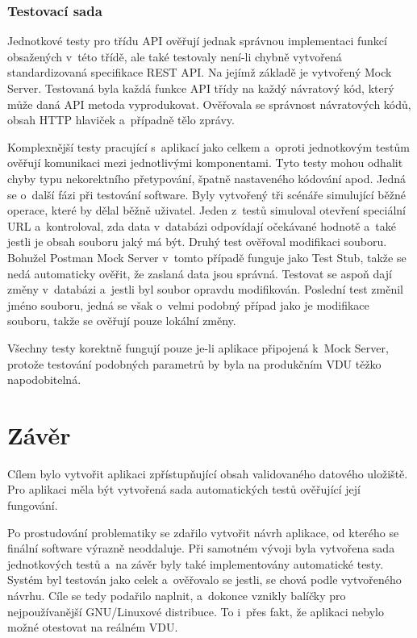 \subsection{Testovací sada}

Jednotkové testy pro třídu API ověřují jednak správnou implementaci funkcí obsažených v této třídě, ale také testovaly není-li chybně vytvořená standardizovaná
specifikace REST API. Na jejímž základě je vytvořený Mock Server. Testovaná byla každá funkce API třídy na každý návratový kód, který může daná API metoda
vyprodukovat. Ověřovala se správnost návratových kódů, obsah HTTP hlaviček a případně tělo zprávy.

Komplexnější testy pracující s aplikací jako celkem a oproti jednotkovým testům ověřují komunikaci mezi jednotlivými komponentami. Tyto testy mohou odhalit chyby typu
nekorektního přetypování, špatně nastaveného kódování apod. Jedná se o další fázi při testování software. Byly vytvořený tři scénáře simulující běžné operace, které
by dělal běžně uživatel. Jeden z testů simuloval otevření speciální URL a kontroloval, zda data v databázi odpovídají očekávané hodnotě a také jestli je obsah souboru
jaký má být. Druhý test ověřoval modifikaci souboru. Bohužel Postman Mock Server v tomto případě funguje jako Test Stub, takže se nedá automaticky ověřit, že zaslaná data
jsou správná. Testovat se aspoň dají změny v databázi a jestli byl soubor opravdu modifikován. Poslední test změnil jméno souboru, jedná se však o velmi podobný případ
jako je modifikace souboru, takže se ověřují pouze lokální změny.

Všechny testy korektně fungují pouze je-li aplikace připojená k Mock Server, protože testování podobných parametrů by byla na produkčním VDU těžko napodobitelná.

\chapter{Závěr}

Cílem bylo vytvořit aplikaci zpřístupňující obsah validovaného datového uložiště. Pro aplikaci měla být vytvořená sada automatických testů ověřující
její fungování.

Po prostudování problematiky se zdařilo vytvořit návrh aplikace, od kterého se finální software výrazně neoddaluje. Při samotném vývoji byla vytvořena sada
jednotkových testů a na závěr byly také implementovány automatické testy. Systém byl testován jako celek a ověřovalo se jestli, se chová podle vytvořeného návrhu.
Cíle se tedy podařilo naplnit, a dokonce vznikly balíčky pro nejpoužívanější GNU/Linuxové distribuce. To i přes fakt, že aplikaci nebylo možné otestovat na reálném 
VDU.

